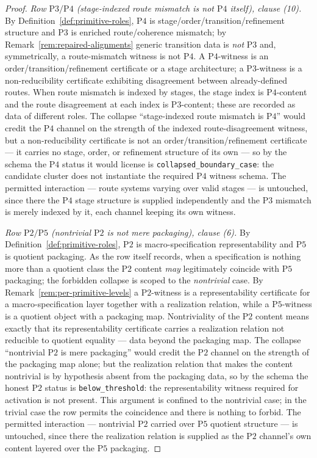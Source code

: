 \documentclass[11pt]{article}
\theoremstyle{definition}
\newcommand{\belowthr}{\texttt{below\_threshold}}
\newcommand{\collapsedbc}{\texttt{collapsed\_boundary\_case}}
\newcommand{\Ptwo}{\ensuremath{\mathrm{P2}}}
\newcommand{\Pthree}{\ensuremath{\mathrm{P3}}}
\newcommand{\Pfour}{\ensuremath{\mathrm{P4}}}
\newcommand{\Pfive}{\ensuremath{\mathrm{P5}}}
\begin{document}
\begin{proof}
\emph{Row \(\Pthree{}/\Pfour{}\) (stage-indexed route mismatch is not
\(\Pfour{}\) itself), clause (10).} By Definition~\ref{def:primitive-roles},
\Pfour{} is stage/order/transition/refinement structure and \Pthree{} is
enriched route/coherence mismatch; by Remark~\ref{rem:repaired-alignments}
generic transition data is \emph{not} \Pthree{} and, symmetrically, a
route-mismatch witness is not \Pfour{}. A \Pfour{}-witness is an
order/transition/refinement certificate or a stage architecture; a
\Pthree{}-witness is a non-reducibility certificate exhibiting disagreement
between already-defined routes. When route mismatch is indexed by stages, the
stage index is \Pfour{}-content and the route disagreement at each index is
\Pthree{}-content; these are recorded as data of different roles. The collapse
``stage-indexed route mismatch is \Pfour{}'' would credit the \Pfour{} channel
on the strength of the indexed route-disagreement witness, but a
non-reducibility certificate is not an order/transition/refinement certificate
--- it carries no stage, order, or refinement structure of its own --- so by the
schema the \Pfour{} status it would license is \collapsedbc{}: the candidate
cluster does not instantiate the required \Pfour{} witness schema. The permitted
interaction --- route systems varying over valid stages --- is untouched, since
there the \Pfour{} stage structure is supplied independently and the \Pthree{}
mismatch is merely indexed by it, each channel keeping its own witness.

\emph{Row \(\Ptwo{}/\Pfive{}\) (nontrivial \(\Ptwo{}\) is not mere packaging),
clause (6).} By Definition~\ref{def:primitive-roles}, \Ptwo{} is
macro-specification representability and \Pfive{} is quotient packaging. As the
row itself records, when a specification is nothing more than a quotient class
the \Ptwo{} content \emph{may} legitimately coincide with \Pfive{} packaging;
the forbidden collapse is scoped to the \emph{nontrivial} case. By
Remark~\ref{rem:per-primitive-levels} a \Ptwo{}-witness is a representability
certificate for a macro-specification layer together with a realization
relation, while a \Pfive{}-witness is a quotient object with a packaging map.
Nontriviality of the \Ptwo{} content means exactly that its representability
certificate carries a realization relation not reducible to quotient equality
--- data beyond the packaging map. The collapse ``nontrivial \Ptwo{} is mere
packaging'' would credit the \Ptwo{} channel on the strength of the packaging
map alone; but the realization relation that makes the content nontrivial is by
hypothesis absent from the packaging data, so by the schema the honest \Ptwo{}
status is \belowthr{}: the representability witness required for activation is
not present. This argument is confined to the nontrivial case; in the trivial
case the row permits the coincidence and there is nothing to forbid. The
permitted interaction --- nontrivial \Ptwo{} carried over \Pfive{} quotient
structure --- is untouched, since there the realization relation is supplied as
the \Ptwo{} channel's own content layered over the \Pfive{} packaging.


\end{proof}
\end{document}
